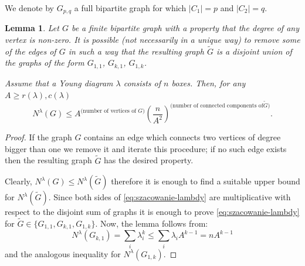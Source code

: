 \documentclass[12pt]{amsart}
\theoremstyle{plain}
\newtheorem{lemma}{Lemma}
\theoremstyle{remark}
\newcommand{\Grozciete}{\tilde{G}}
\begin{document}
We denote by $G_{p,q}$ a full bipartite graph for which $|C_1|=p$ and $|C_2|=q$.

\begin{lemma}
\label{lem:grafGprim}
Let $G$ be a finite bipartite graph with a property that the degree of any vertex is non-zero.
It is possible (not necessarily in a unique way) to remove some of the edges of
$G$ in such a way that the resulting graph $\Grozciete$
is a disjoint union of the graphs of the form $G_{1,1}$, $G_{k,1}$, $G_{1,k}$.

Assume that a Young diagram $\lambda$ consists of $n$ boxes. Then, for any
$A \geq r(\lambda),c(\lambda)$
\begin{equation} 
\label{eq:szacowanie-lambdy}
N^{\lambda}(G)\leq A^{\text{(number of vertices of $G$)}} 
\left(\frac{n}{A^2}\right)^{\text{(number of connected components of
$\Grozciete$)}}.
\end{equation}
\end{lemma}
\begin{proof} 
If the graph $G$ contains an edge which connects two vertices of degree bigger than one we 
remove it and iterate this procedure; if no such edge exists then the resulting graph $\Grozciete$ 
has the desired property.

Clearly, $N^\lambda(G)\leq N^\lambda(\Grozciete)$ therefore it is enough to find a suitable upper bound
for $N^\lambda(\Grozciete)$. Since both sides of \eqref{eq:szacowanie-lambdy}
are multiplicative with
respect to the disjoint sum of graphs it is enough to prove \eqref{eq:szacowanie-lambdy}
for $\Grozciete\in\{G_{1,1},G_{k,1}, G_{1,k}\}$. Now, the lemma follows from:
$${N^\lambda}(G_{k,1})=\sum_i \lambda_i^k\leq  
\sum_i \lambda_i A^{k-1} = n A^{k-1}$$
and the analogous inequality for ${N^\lambda}(G_{1,k})$. 
\end{proof}
\end{document}
